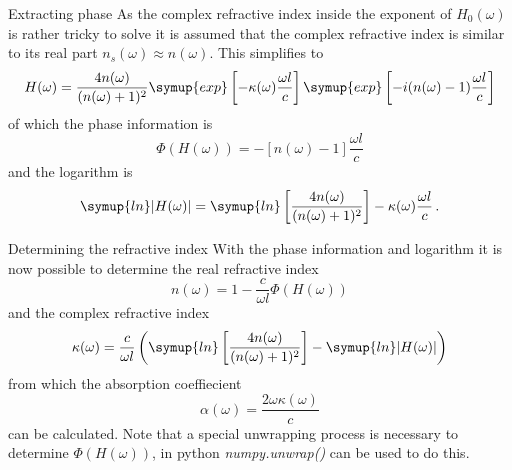 \documentclass[aspectratio=1610, 9pt]{beamer}
\begin{document}
\begin{frame}{Extracting phase}
  As the complex refractive index inside the exponent of $H_0(\omega)$ is rather tricky to solve it is assumed that the complex refractive index is similar to its real part $n_s(\omega) \approx n(\omega)$.
  This simplifies to 
  \begin{equation}
    H(\omega) = \frac{4n(\omega)}{(n(\omega) + 1)^2} \symup{exp}\left[-\kappa(\omega) \frac{\omega l }{c}\right] \symup{exp}\left[- i(n(\omega) - 1) \frac{\omega l}{c}\right]
  \end{equation}
  of which the phase information is
  \begin{equation}
    \Phi(H(\omega)) = -[n(\omega) - 1] \frac{\omega l}{c}
  \end{equation}
  and the logarithm is
  \begin{equation}
    \symup{ln}|H(\omega)| = \symup{ln}\left[ \frac{4n(\omega)}{(n(\omega) +1)^2}\right] - \kappa(\omega) \frac{\omega l}{c} \, .
  \end{equation}
\end{frame}

\begin{frame}{Determining the refractive index}
  With the phase information and logarithm it is now possible to determine the real refractive index 
  \begin{equation}
    n(\omega) = 1 - \frac{c}{\omega l} \Phi(H(\omega))
  \end{equation}
  and the complex refractive index 
  \begin{equation}
    \kappa(\omega) = \frac{c}{\omega l } \left( \symup{ln}\left[ \frac{4 n(\omega)}{(n(\omega) + 1)^2}\right] - \symup{ln}|H(\omega)|\right)
  \end{equation}
  from which the absorption coeffiecient
  \begin{equation}
    \alpha(\omega) = \frac{2 \omega \kappa(\omega)}{c}
  \end{equation}
  can be calculated.
  Note that a special unwrapping process is necessary to determine $\Phi(H(\omega))$, in python \textit{numpy.unwrap()} can be used to do this.
\end{frame}
\end{document}
